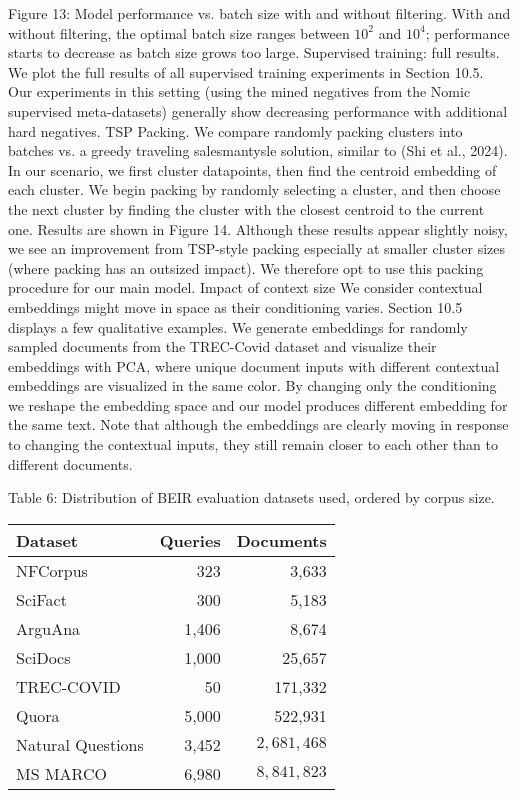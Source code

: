 \begin{tabular}
{Figure 13: Model performance vs. batch size with and without filtering. With and without filtering, the optimal batch size ranges between \(10^{2}\) and \(10^{4}\); performance starts to decrease as batch size grows too large.
Supervised training: full results. We plot the full results of all supervised training experiments in Section 10.5. Our experiments in this setting (using the mined negatives from the Nomic supervised meta-datasets) generally show decreasing performance with additional hard negatives.
TSP Packing. We compare randomly packing clusters into batches vs. a greedy traveling salesmantysle solution, similar to (Shi et al., 2024). In our scenario, we first cluster datapoints, then find the centroid embedding of each cluster. We begin packing by randomly selecting a cluster, and then choose the next cluster by finding the cluster with the closest centroid to the current one. Results are shown in Figure 14. Although these results appear slightly noisy, we see an improvement from TSP-style packing especially at smaller cluster sizes (where packing has an outsized impact). We therefore opt to use this packing procedure for our main model.
Impact of context size We consider contextual embeddings might move in space as their conditioning varies. Section 10.5 displays a few qualitative examples. We generate embeddings for randomly sampled documents from the TREC-Covid dataset and visualize their embeddings with PCA, where unique document inputs with different contextual embeddings are visualized in the same color. By changing only the conditioning we reshape the embedding space and our model produces different embedding for the same text. Note that although the embeddings are clearly moving in response to changing the contextual inputs, they still remain closer to each other than to different documents.

Table 6: Distribution of BEIR evaluation datasets used, ordered by corpus size.
\begin{tabular}{lrr}
\hline Dataset & Queries & Documents \\
\hline NFCorpus & 323 & 3,633 \\
SciFact & 300 & 5,183 \\
ArguAna & 1,406 & 8,674 \\
SciDocs & 1,000 & 25,657 \\
TREC-COVID & 50 & 171,332 \\
Quora & 5,000 & 522,931 \\
Natural Questions & 3,452 & \(2,681,468\) \\
MS MARCO & 6,980 & \(8,841,823\) \\
\hline
\end{tabular}

}
\end{tabular}
